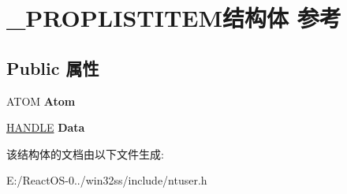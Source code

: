 \hypertarget{struct___p_r_o_p_l_i_s_t_i_t_e_m}{}\section{\+\_\+\+P\+R\+O\+P\+L\+I\+S\+T\+I\+T\+E\+M结构体 参考}
\label{struct___p_r_o_p_l_i_s_t_i_t_e_m}
\subsection*{Public 属性}
\begin{DoxyCompactItemize}
\item 
\mbox{\label{struct___p_r_o_p_l_i_s_t_i_t_e_m_a458b4a684a6bc0b7b14856a0a5cd11e8}} 
A\+T\+OM {\bfseries Atom}
\item 
\mbox{\label{struct___p_r_o_p_l_i_s_t_i_t_e_m_ae4edb5da135841b9dde59ac9038d81fe}} 
\hyperlink{interfacevoid}{H\+A\+N\+D\+LE} {\bfseries Data}
\end{DoxyCompactItemize}


该结构体的文档由以下文件生成\+:\begin{DoxyCompactItemize}
\item 
E\+:/\+React\+O\+S-\/0../win32ss/include/ntuser.\+h\end{DoxyCompactItemize}
